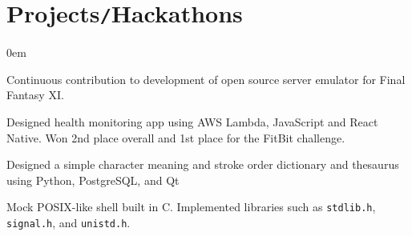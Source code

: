\documentclass[10pt]{article}
\begin{document}
\section*{Projects\texttt{/}Hackathons}
\vspace*{-8pt}\hspace*{10pt}\begin{minipage}{0.93\textwidth}
    \begin{description}
        \itemsep0em
        \raggedright
        \item[AirSkyBoat \href{https://github.com/luke-belinc/AirSkyBoat}{\fontsize{9pt}{9pt}\faLink}] Continuous contribution to 
            development of open source server emulator for Final Fantasy XI.
        \item[DHack \href{https://github.com/kraudo/keepup}{\fontsize{9pt}{9pt}\faLink}] Designed health monitoring app using AWS 
            Lambda, JavaScript and React Native. Won 2nd place overall and 1st place for the FitBit challenge.
        \item[Chinese Character Dictionary \href{https://github.com/luke-belinc/chinese-char-dict}{\fontsize{9pt}{9pt}\faLink}] 
            Designed a simple character meaning and stroke order dictionary and thesaurus using Python, PostgreSQL, and Qt
        \item[Mock Shell \href{https://github.com/luke-belinc/c-fun}{\fontsize{9pt}{9pt}\faLink}] Mock POSIX-like shell built in C. Implemented libraries such as \texttt{stdlib.h}, \texttt{signal.h}, 
            and \texttt{unistd.h}.
    \end{description}
\end{minipage}
\end{document}
